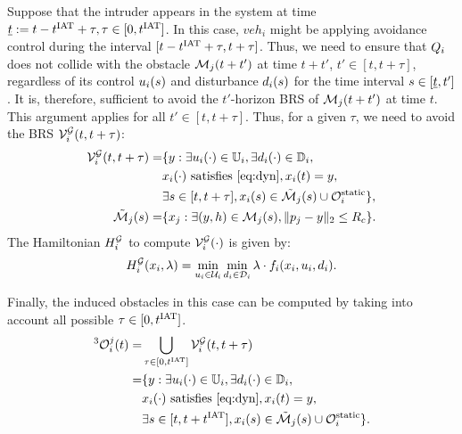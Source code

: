Suppose that the intruder appears in the system at time $\underline{t} := t - t^\text{IAT} + \tau, \tau \in [0, t^\text{IAT}]$. In this case, $veh_i$ might be applying avoidance control during the interval $[t - t^\text{IAT} + \tau, t + \tau]$. Thus, we need to ensure that $Q_i$ does not collide with the obstacle $\mathcal{M}_j(t + t')$ at time $t + t'$, $t' \in [t, t + \tau]$, regardless of its control $u_i(s)$ and disturbance $d_i(s)$ for the time interval $s \in [\underline{t}, t']$. It is, therefore, sufficient to avoid the $t'$-horizon BRS of $\mathcal{M}_j(t + t')$ at time $t$. This argument applies for all $t' \in [t, t + \tau]$. Thus, for a given $\tau$, we need to avoid the BRS $\mathcal{V}^{\mathcal{G}}_{i}(t, t+\tau)$:
\begin{equation}  \label{eq:ObsBRS_case3}
\begin{aligned}
\brs^{\mathcal{G}}_{i}(t, t+\tau) = & \{y: \exists \ctrl_i(\cdot) \in \cfset_i, \exists \dstb_i(\cdot) \in \dfset_i, \\
& \state_i(\cdot) \text{ satisfies \eqref{eq:dyn}}, \state_i(t) = y, \\
& \exists s \in [t, t+\tau], \state_i(s) \in \tilde{\boset}_j(s) \cup \soset_i \}, \\
\tilde{\boset}_j(s) = & \{\state_j: \exists (y, h) \in \boset_j(s), \|\pos_j - y\|_2 \le \rc \}.
\end{aligned}
\end{equation}
The Hamiltonian $H^{\mathcal{G}}_{i}$ to compute $\mathcal{V}^{\mathcal{G}}_{i}(\cdot)$ is given by:
\begin{equation} \label{eqn:BRS_obsham}
\ham^{\mathcal{G}}_{i}(\state_i, \costate) = \min_{\ctrl_i \in \cset_i} \min_{\dstb_i \in \dset_i} \costate \cdot f_i (\state_i, \ctrl_i, \dstb_i).
\end{equation}

Finally, the induced obstacles in this case can be computed by taking into account all possible $\tau \in [0, t^\text{IAT}]$.
\begin{equation} \label{eq:intruderObs_case3}
\begin{aligned}
^3\ioset_i^j(t) = & \bigcup_{\tau \in [0, \iat]} \brs^{\mathcal{G}}_{i}(t, t+\tau)\\
= & \{y: \exists \ctrl_i(\cdot) \in \cfset_i, \exists \dstb_i(\cdot) \in \dfset_i, \\
& \state_i(\cdot) \text{ satisfies \eqref{eq:dyn}}, \state_i(t) = y, \\
& \exists s \in [t, t+\iat], \state_i(s) \in \tilde{\boset}_j(s) \cup \soset_i \}.
\end{aligned}
\end{equation}

